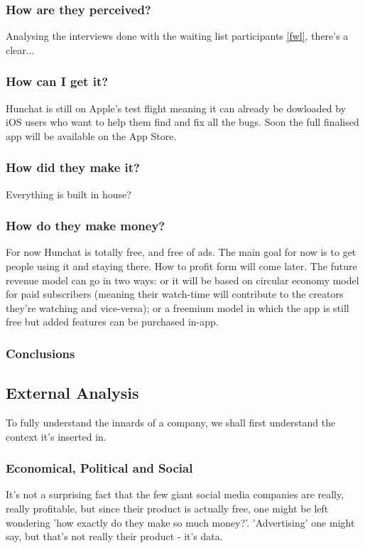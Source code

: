 \documentclass[12pt]{article}
\begin{document}
	\subsubsection{How are they perceived?}
Analysing the interviews done with the waiting list participants \ref{fwl}, there's a clear...

	\subsubsection{How can I get it?}
Hunchat is still on Apple's test flight meaning it can already be dowloaded by iOS users who want to help them find and fix all the bugs. Soon the full finalised app will be available on the App Store.

	\subsubsection{How did they make it?}
Everything is built in house?

	\subsubsection{How do they make money?}
For now Hunchat is totally free, and free of ads. The main goal for now is to get people using it and staying there. How to profit form will come later. The future revenue model can go in two ways: or it will be based on circular economy model for paid subscribers (meaning their watch-time will contribute to the creators they're watching and vice-versa); or a freemium model in which the app is still free but added features can be purchased in-app.

	\subsubsection{Conclusions}

\subsection{External Analysis}

To fully understand the innards of a company, we shall first understand the context it's inserted in.
	
	\subsubsection{Economical, Political and Social}
	
	It's not a surprising fact that the few giant social media companies are really, really profitable, but since their product is actually free, one might be left wondering 'how exactly do they make so much money?'. 'Advertising' one might say, but that's not really their product - it's data.
	
\end{document}

